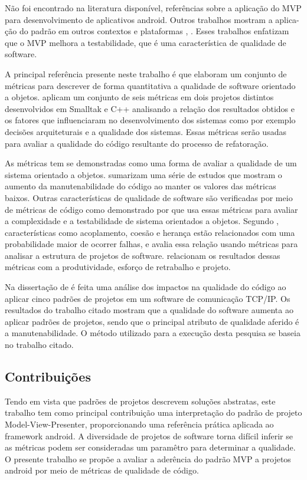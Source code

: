\documentclass[conference]{IEEEtran}
\begin{document}
Não foi encontrado na literatura disponível, referências sobre a aplicação do
MVP para desenvolvimento de aplicativos android. Outros trabalhos mostram a
aplica- ção do padrão em outros contextos e plataformas  \cite{presenterfirst},
\cite{yangmvp}. Esses trabalhos enfatizam que o MVP melhora a
testabilidade, que é uma característica de qualidade de software.

A principal referência presente neste trabalho é \cite{cksuite} que
elaboram um conjunto de métricas para descrever de forma quantitativa a
qualidade de software orientado a objetos. \cite{cksuite} aplicam um
conjunto de seis métricas em dois projetos distintos desenvolvidos em Smalltak e
C++ analisando a relação dos resultados obtidos e os fatores que influenciaram
no desenvolvimento dos sistemas como por exemplo decisões arquiteturais e a
qualidade dos sistemas. Essas métricas serão usadas para avaliar a qualidade do
código resultante do processo de refatoração.

As métricas \cite{cksuite} tem se demonstradas como uma forma de avaliar a
qualidade de um sistema orientado a objetos. \cite{Dubey:2011} sumarizam
uma série de estudos que mostram o aumento da manutenabilidade do código ao
manter os valores das métricas baixos. Outras características de
qualidade de software são verificadas por meio de métricas de código
como demonstrado por \cite{Khalid:2010} que usa essas métricas para
avaliar a complexidade e a testabilidade de sistema orientados a objetos.
Segundo \cite{Briand:2000}, características como acoplamento, coesão e
herança estão relacionados com uma probabilidade maior de ocorrer falhas, e
avalia essa relação usando métricas para analisar a estrutura de projetos de
software. \cite{CK:98} relacionam os resultados dessas métricas com a
produtividade, esforço de retrabalho e projeto.

Na dissertação de \cite{turk} é feita uma análise dos impactos na
qualidade do código  ao aplicar cinco padrões de projetos em um software de comunicação
TCP/IP. Os resultados do trabalho citado mostram que a qualidade do software
aumenta ao aplicar padrões de projetos, sendo que o principal atributo de
qualidade aferido é a manutenabilidade. O método utilizado para a execução desta
pesquisa se baseia no trabalho citado. 

\subsection{Contribuições}


Tendo em vista que padrões de projetos descrevem soluções abstratas, este
trabalho tem como principal contribuição uma interpretação do padrão de projeto
Model-View-Presenter, proporcionando uma referência prática aplicada ao
framework android. A diversidade de projetos de software torna difícil inferir
se as métricas podem ser consideradas um paramêtro para determinar a qualidade.
O presente trabalho se propõe a avaliar a aderência do padrão MVP a projetos
android por meio de métricas de qualidade de código.
\end{document}
